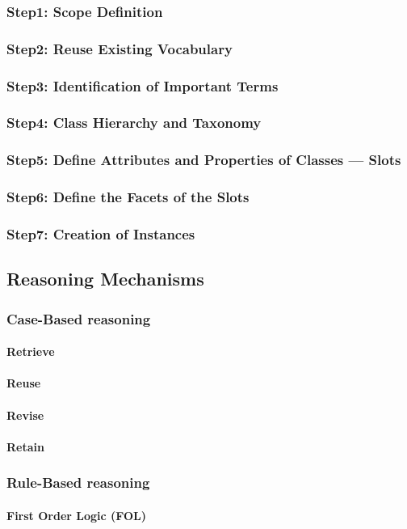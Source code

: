     \subsubsection{Step1: Scope Definition}
    
    \subsubsection{Step2: Reuse Existing Vocabulary}
    
    \subsubsection{Step3: Identification of Important Terms}
    
    \subsubsection{Step4: Class Hierarchy and Taxonomy}
    
    \subsubsection{Step5: Define Attributes and Properties of Classes — Slots}
    
    \subsubsection{Step6: Define the Facets of the Slots}
    
    \subsubsection{Step7: Creation of Instances}
    

\subsection{Reasoning Mechanisms}
    \subsubsection{Case-Based reasoning}
        \paragraph{Retrieve}
        
        \paragraph{Reuse}
        
        \paragraph{Revise}
        
        \paragraph{Retain}
    
    \subsubsection{Rule-Based reasoning}
        \paragraph{First Order Logic (FOL)}

